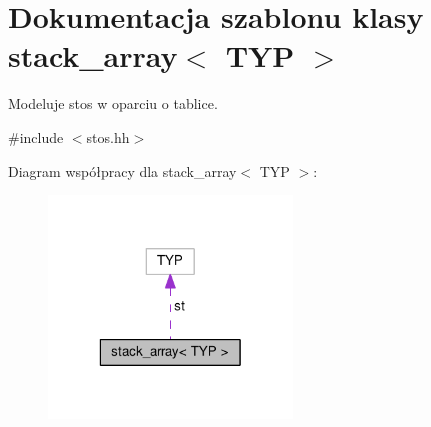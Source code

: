 \hypertarget{classstack__array}{\section{Dokumentacja szablonu klasy stack\-\_\-array$<$ T\-Y\-P $>$}
\label{classstack__array}
}


Modeluje stos w oparciu o tablice.  




{\ttfamily \#include $<$stos.\-hh$>$}



Diagram współpracy dla stack\-\_\-array$<$ T\-Y\-P $>$\-:\nopagebreak
\begin{figure}[H]
\begin{center}
\leavevmode
\includegraphics[width=184pt]{classstack__array__coll__graph}
\end{center}
\end{figure}
